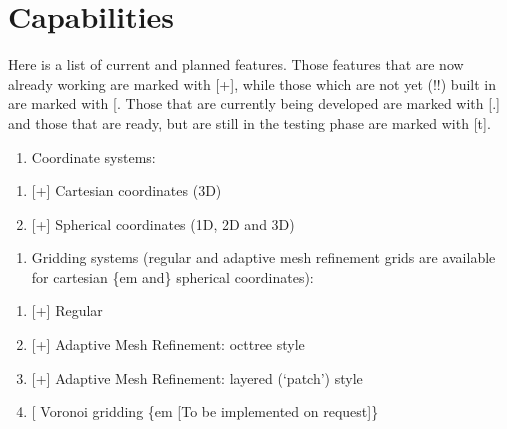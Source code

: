 \documentclass[letterpaper,10pt,english]{sphinxmanual}
\begin{document}
\section{Capabilities}
\label{\detokenize{introduction:capabilities}}
Here is a list of current and planned features. Those features that are now
already working are marked with {[}+{]}, while those which are not yet (!!) built in
are marked with {[}\sphinxhyphen{}{]}. Those that are currently being developed are marked with
{[}.{]} and those that are ready, but are still in the testing phase are marked with
{[}t{]}.
\begin{enumerate}
%
\item {} 
Coordinate systems:

\end{enumerate}
\begin{enumerate}
%
\item {} 
{[}+{]} Cartesian coordinates (3\sphinxhyphen{}D)

\item {} 
{[}+{]} Spherical coordinates (1\sphinxhyphen{}D, 2\sphinxhyphen{}D and 3\sphinxhyphen{}D)

\end{enumerate}
\begin{enumerate}
%
\item {} 
Gridding systems (regular and adaptive mesh refinement grids are
available for cartesian \{em and\} spherical coordinates):

\end{enumerate}
\begin{enumerate}
%
\item {} 
{[}+{]} Regular

\item {} 
{[}+{]} Adaptive Mesh Refinement: oct\sphinxhyphen{}tree style

\item {} 
{[}+{]} Adaptive Mesh Refinement: layered (‘patch’) style

\item {} 
{[}\sphinxhyphen{}{]} Voronoi gridding \{em {[}To be implemented on request{]}\}

\end{enumerate}
\end{document}

